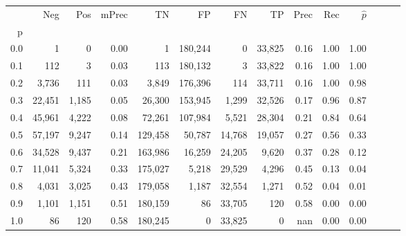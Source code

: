 \begin{tabular}{rrrrrrrrrrrrrr}
\toprule
{} &     Neg &    Pos & mPrec &       TN &       FP &      FN &      TP &  Prec &   Rec & $\hat{p}$ \\
p   &         &        &       &          &          &         &         &       &       &           \\
\midrule
0.0 &       1 &      0 &  0.00 &        1 &  180,244 &       0 &  33,825 &  0.16 &  1.00 &      1.00 \\
0.1 &     112 &      3 &  0.03 &      113 &  180,132 &       3 &  33,822 &  0.16 &  1.00 &      1.00 \\
0.2 &   3,736 &    111 &  0.03 &    3,849 &  176,396 &     114 &  33,711 &  0.16 &  1.00 &      0.98 \\
0.3 &  22,451 &  1,185 &  0.05 &   26,300 &  153,945 &   1,299 &  32,526 &  0.17 &  0.96 &      0.87 \\
0.4 &  45,961 &  4,222 &  0.08 &   72,261 &  107,984 &   5,521 &  28,304 &  0.21 &  0.84 &      0.64 \\
0.5 &  57,197 &  9,247 &  0.14 &  129,458 &   50,787 &  14,768 &  19,057 &  0.27 &  0.56 &      0.33 \\
0.6 &  34,528 &  9,437 &  0.21 &  163,986 &   16,259 &  24,205 &   9,620 &  0.37 &  0.28 &      0.12 \\
0.7 &  11,041 &  5,324 &  0.33 &  175,027 &    5,218 &  29,529 &   4,296 &  0.45 &  0.13 &      0.04 \\
0.8 &   4,031 &  3,025 &  0.43 &  179,058 &    1,187 &  32,554 &   1,271 &  0.52 &  0.04 &      0.01 \\
0.9 &   1,101 &  1,151 &  0.51 &  180,159 &       86 &  33,705 &     120 &  0.58 &  0.00 &      0.00 \\
1.0 &      86 &    120 &  0.58 &  180,245 &        0 &  33,825 &       0 &   nan &  0.00 &      0.00 \\
\bottomrule
\end{tabular}

